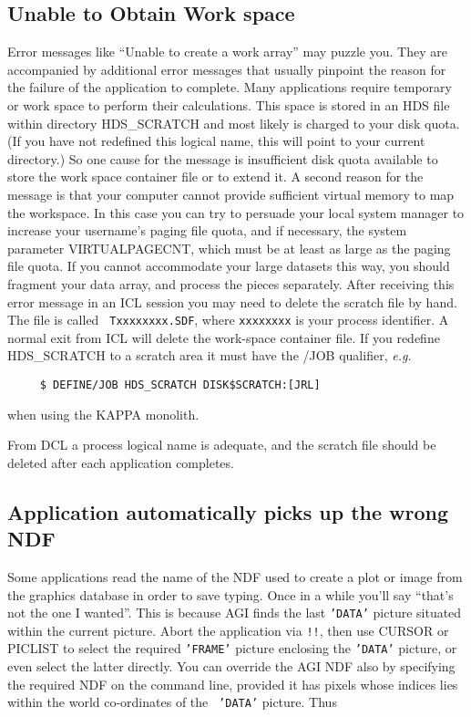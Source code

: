 {\subsection{Unable to Obtain Work space}
Error messages like ``Unable to create a work array'' may puzzle you.
They are accompanied by additional error messages that usually pinpoint
the reason for the failure of the application to complete.
Many applications require temporary or work space to
perform their calculations.  This space is stored in an HDS file within
directory HDS\_SCRATCH and most likely is charged to your disk quota.
(If you have not redefined this logical name, this will point to your
current directory.)
So one cause for the message is insufficient disk quota available to
store the work space container file or to extend it.  A second reason
for the message is that your computer cannot provide sufficient
virtual memory to map the workspace.  In this case you can try to
persuade your local system manager to increase your username's paging
file quota, and if necessary, the system parameter VIRTUALPAGECNT, which
must be at least as large as the paging file quota.
If you cannot accommodate your large datasets this way,
you should fragment your data array, and process the pieces separately.
After receiving this error message in an {\small ICL} session you may need
to delete the scratch file by hand.  The file is called {\tt
Txxxxxxxx.SDF}, where {\tt xxxxxxxx} is your process identifier.
A normal exit from {\small ICL} will delete the work-space
container file.  If you redefine HDS\_SCRATCH to a scratch area it
must have the /JOB qualifier, {\it e.g.}\

\small
\begin{verbatim}
     $ DEFINE/JOB HDS_SCRATCH DISK$SCRATCH:[JRL]
\end{verbatim}
\normalsize
when using the {\small KAPPA} monolith.

From {\small DCL} a process logical name is adequate, and the scratch
file should be deleted after each application completes.

\subsection{Application automatically picks up the wrong NDF}
Some applications read the name of the NDF used to create a plot or
image from the graphics database in order to save typing.  Once in a
while you'll say ``that's not the one I wanted''.  This is because AGI finds
the last {\tt 'DATA'} picture situated within the current picture.
Abort the application via {\tt !!}, then use CURSOR or PICLIST to select
the required {\tt 'FRAME'} picture enclosing the {\tt 'DATA'} picture,
or even select the latter directly.  You can override the AGI NDF also
by specifying the required NDF on the command line, provided it has
pixels whose indices lies within the world co-ordinates of the {\tt
'DATA'} picture.  Thus

}
